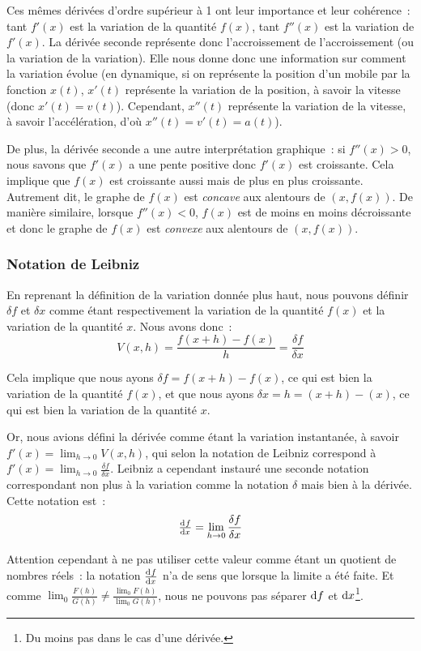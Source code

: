 \documentclass{article}
\theoremstyle{definition}
\theoremstyle{remark}
\begin{document}
			Ces mêmes dérivées d'ordre supérieur à 1 ont leur importance et leur cohérence~: tant $f'(x)$ est la variation de la quantité
			$f(x)$, tant $f''(x)$ est la variation de $f'(x)$. La dérivée seconde représente donc l'accroissement de l'accroissement
			(ou la variation de la variation). Elle nous donne donc une information sur comment la variation évolue (en dynamique,
			si on représente la position d'un mobile par la fonction $x(t)$, $x'(t)$ représente la variation de la position, à savoir la
			vitesse (donc $x'(t) = v(t)$). Cependant, $x''(t)$ représente la variation de la vitesse, à savoir l'accélération, d'où
			$x''(t) = v'(t) = a(t)$).

			De plus, la dérivée seconde a une autre interprétation graphique~: si $f''(x) > 0$, nous savons que $f'(x)$ a une pente positive
			donc $f'(x)$ est croissante. Cela implique que $f(x)$ est croissante aussi mais de plus en plus croissante. Autrement dit,
			le graphe de $f(x)$ est \textit{concave} aux alentours de $(x, f(x))$. De manière similaire, lorsque $f''(x) < 0$, $f(x)$ est
			de moins en moins décroissante et donc le graphe de $f(x)$ est \textit{convexe} aux alentours de $(x, f(x))$.

		\subsubsection{Notation de Leibniz}
			En reprenant la définition de la variation donnée plus haut, nous pouvons définir $\delta f$ et $\delta x$ comme étant
			respectivement la variation de la quantité $f(x)$ et la variation de la quantité $x$. Nous avons donc~:
			\[V(x, h) = \frac {f(x+h) - f(x)}{h} = \frac {\delta f}{\delta x}\]

			Cela implique que nous ayons $\delta f = f(x + h) - f(x)$, ce qui est bien la variation de la quantité $f(x)$, et que nous
			ayons $\delta x = h = (x + h) - (x)$, ce qui est bien la variation de la quantité $x$.

			Or, nous avions défini la dérivée comme étant la variation instantanée, à savoir $f'(x) = \lim_{h \to 0}V(x, h)$, qui selon
			la notation de Leibniz correspond à $f'(x) = \lim_{h \to 0}\frac {\delta f}{\delta x}$. Leibniz a cependant instauré une
			seconde notation correspondant non plus à la variation comme la notation $\delta$ mais bien à la dérivée. Cette notation est~:
			\[\od{f}{x} = \lim_{h \to 0}\frac {\delta f}{\delta x}\]

			Attention cependant à ne pas utiliser cette valeur comme étant un quotient de nombres réels~: la notation $\od fx$ n'a de sens
			que lorsque la limite a été faite. Et comme $\lim_0 \frac {F(h)}{G(h)} \neq \frac {\lim_0 F(h)}{\lim_0 G(h)}$, nous ne pouvons
			pas séparer $\dif f$ et $\dif x$\footnote{Du moins pas dans le cas d'une dérivée.}.
\end{document}
